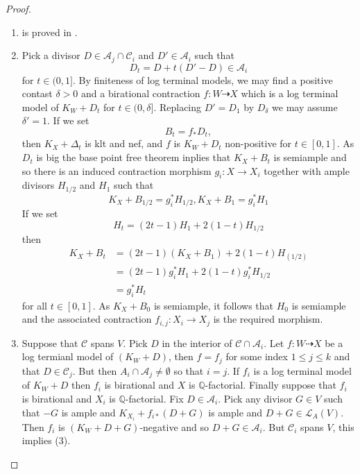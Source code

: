 \documentclass{article}
\begin{document}
\begin{proof}
  \begin{enumerate}[1]
    \item is proved in \cite{birkarExistenceMinimalModels2009}.
    \item Pick a divisor $D \in \mathcal{A}_{j} \cap \mathcal{C}_{i}$ and $D' \in \mathcal{A}_{i}$ such that
      \[
        D_{t}=D+t(D'-D) \in \mathcal{A}_{i} 
      \]
      for $t \in (0,1]$. By finiteness of log terminal models, we may find a positive contast $\delta>0 $ and a birational contraction $
      f: W \dashrightarrow X$ which is a log terminal model of $K_{W}+D_{t}$ for  $t \in (0,\delta]$. Replacing $D'=D_{1}$ by $D_{\delta}$ we may assume $\delta'=1$. If we set 
      \[
        B_{t}=f_*D_{t}
      ,\]
      then $K_{X}+\Delta_{t}$ is klt and nef, and $f$ is $K_{W}+D_{t}$ non-positive for $t \in [0,1]$. As $D_{t}$ is big the base point free theorem inplies that $K_{X}+B_{t}$ is semiample and so there is an induced contraction morphism $g_i: X \to X_{i}$ together with ample divisors $H_{1/2}$ and $H_{1}$ such that 
      \[
        K_{X}+B_{1/2} =g_{i}^*H_{1/2},  K_{X}+B_{1} =g_{i}^*H_{1}
      \]
      If we set 
      \[
        H_{t}=(2t-1)H_1 +2(1-t)H_{1/2}
      \]
      then 
      \[
        \begin{aligned}
          K_{X}+B_{t}&=(2t-1)(K_{X}+B_{1})+2(1-t)H_{(1/2)}\\
                     &=(2t-1)g_{i}^*H_{1}+2(1-t)g_{i}^*H_{1/2}\\ 
                     &=g_{i}^*H_{t}
        \end{aligned}
      \]
      for all $t \in [0,1]$. As $K_{X}+B_{0}$ is semiample, it follows that $H_{0}$ is semiample and the associated contraction $f_{i,j}:X_{i}\to X_{j}$ is the required morphism.  
    \item Suppose that $\mathcal{C}$ spans $V$. Pick $D$ in the interior of $\mathcal{C} \cap \mathcal{A}_{i}$. Let $f:W \dashrightarrow  X$ be a log termianl model of $(K_{W}+D)$, then $f=f_{j}$ for some index $1\leqslant j\leqslant k$ and that $D \in \mathcal{C}_{j}$. But then $A_{i} \cap \mathcal{A}_{j}\neq \emptyset$ so that $i=j$. If $f_{i}$ is a log terminal model of $K_{W}+D$ then $f_{i}$ is birational and $X$ is $\mathbb{Q}$-factorial. Finally suppose that $f_{i}$ is birational and $X_{i}$ is $\mathbb{Q}$-factorial. Fix $D \in \mathcal{A}_{i}$. Pick any divisor $G \in V$ such that $-G$ is ample and $K_{X_{i}}+
f_{i*}(D+G)$ is ample and $D+G \in \mathcal{L}_{A}(V)$. Then $f_{i}$ is $(K_{W}+D+G)$-negative and so $D+G \in \mathcal{A}_{i}$. But $\mathcal{C}_{i}$ spans $V$, this implies (3).

\end{enumerate}
\end{proof}
\end{document}
